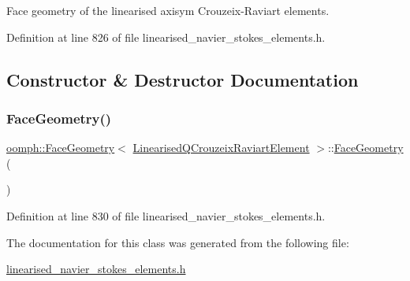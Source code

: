 Face geometry of the linearised axisym Crouzeix-\/\+Raviart elements. 

Definition at line 826 of file linearised\+\_\+navier\+\_\+stokes\+\_\+elements.\+h.



\subsection{Constructor \& Destructor Documentation}
\mbox{\label{classoomph_1_1FaceGeometry_3_01LinearisedQCrouzeixRaviartElement_01_4_a4a7413d3dcb53357b62feaa6b09308e7}} 
\subsubsection{\texorpdfstring{Face\+Geometry()}{FaceGeometry()}}
{\footnotesize\ttfamily \hyperlink{classoomph_1_1FaceGeometry}{oomph\+::\+Face\+Geometry}$<$ \hyperlink{classoomph_1_1LinearisedQCrouzeixRaviartElement}{Linearised\+Q\+Crouzeix\+Raviart\+Element} $>$\+::\hyperlink{classoomph_1_1FaceGeometry}{Face\+Geometry} (\begin{DoxyParamCaption}{ }\end{DoxyParamCaption})\hspace{0.3cm}{\ttfamily [inline]}}



Definition at line 830 of file linearised\+\_\+navier\+\_\+stokes\+\_\+elements.\+h.



The documentation for this class was generated from the following file\+:\begin{DoxyCompactItemize}
\item 
\hyperlink{linearised__navier__stokes__elements_8h}{linearised\+\_\+navier\+\_\+stokes\+\_\+elements.\+h}\end{DoxyCompactItemize}
